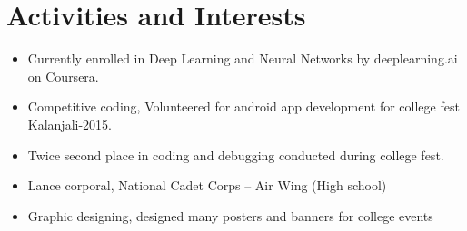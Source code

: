 \documentclass[11pt]{article}
\begin{document}
\section{Activities and Interests}
\begin{itemize}
	\itemsep0em
	\item Currently enrolled in Deep Learning and Neural Networks by deeplearning.ai on Coursera. 
	\item Competitive coding, Volunteered for android app development for college fest Kalanjali-2015.
	\item Twice second place in coding and debugging conducted during college fest.
	\item Lance corporal, National Cadet Corps – Air Wing (High school)
	\item Graphic designing, designed many posters and banners for college events
\end{itemize}
\end{document}
